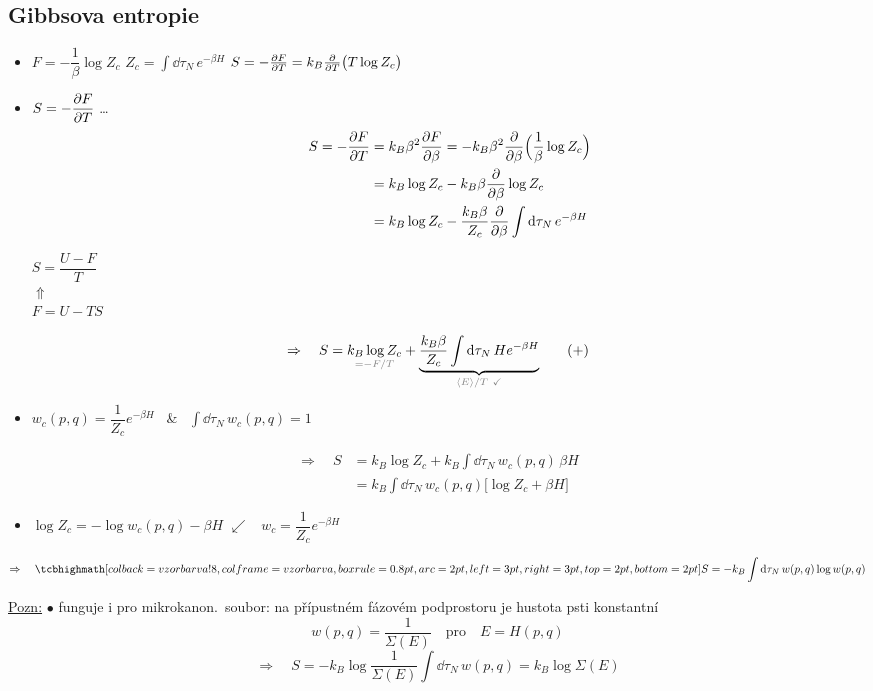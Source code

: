 \subsection{Gibbsova entropie}
\begin{itemize}
  \item $F = -\dfrac1\beta\log Z_c$ \qquad $Z_c = \int\dd\tau_N\,e^{-\beta H}$ \qquad $S = -\pdv{F}{T} = k_B\pdv{T}\big(T\log Z_c\big)$
  \item \begin{minipage}[t]{0.7\textwidth}
  \vspace{-4pt}
  $\displaystyle S = -\pdv{F}{T}$ \dots
  \begin{align*}
    S = -\pdv{F}{T} &= k_B\beta^2\pdv{F}{\beta} = -k_B\beta^2\pdv{\beta}\Big(\frac1\beta\log Z_c\Big) \\
    &= k_B\log Z_c - k_B\beta\pdv{\beta}\log Z_c \\
    &= k_B\log Z_c - \frac{k_B\beta}{Z_c}\pdv{\beta}\int\dd\tau_N\,e^{-\beta H}
  \end{align*}
  \end{minipage}
  \begin{minipage}[t]{0.25\textwidth}
  \color{gray}\small
  $S = \dfrac{U - F}{T}$ \\
  \hspace*{0.5cm}$\Uparrow$ \\
  $F = U - TS$
  \end{minipage}
\end{itemize}
\[
  \Rightarrow\quad S = \underset{\textcolor{gray}{= -F/T}}{k_B\log Z_c}
  + \underbrace{\frac{k_B\beta}{Z_c}\int\dd\tau_N\,He^{-\beta H}}_{\textcolor{gray}{\langle E\rangle/T\ \checkmark}} \qquad (+)
\]
\begin{itemize}
  \item $w_c(p,q) = \dfrac{1}{Z_c}e^{-\beta H}$ \ \& \ $\int\dd\tau_N\,w_c(p,q) = 1$
\end{itemize}
\begin{align*}
  \Rightarrow\quad S &= k_B\log Z_c + k_B\int\dd\tau_N\,w_c(p,q)\,\beta H \\
  &= k_B\int\dd\tau_N\,w_c(p,q)\big[\log Z_c + \beta H\big]
\end{align*}
\begin{itemize}
  \item $\log Z_c = -\log w_c(p,q) - \beta H$ \hfill $\swarrow$ \ $w_c = \dfrac{1}{Z_c}e^{-\beta H}$
\end{itemize}
\begin{veta}
\[
  \Rightarrow\quad \vzorec{S = -k_B\int\dd\tau_N\,w(p,q)\log w(p,q)}
\]
\end{veta}
\underline{Pozn:} $\bullet$ funguje i pro mikrokanon.\ soubor: na přípustném fázovém podprostoru je hustota psti konstantní
\[
  w(p,q) = \frac{1}{\Sigma(E)} \quad\text{pro}\quad E = H(p,q)
\]
\[
  \Rightarrow\quad S = -k_B\log\frac{1}{\Sigma(E)}\int\dd\tau_N\,w(p,q) = k_B\log\Sigma(E)
\]

